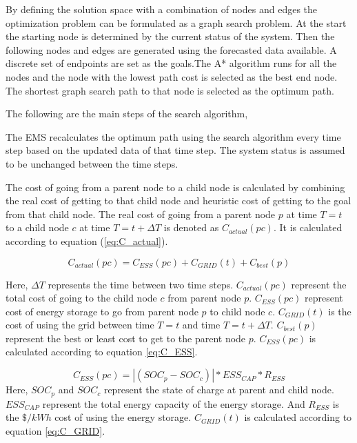 By defining the solution space with a combination of nodes and edges the optimization problem can be formulated as a graph search problem. At the start the starting node is determined by the current status of the system. Then the following nodes and edges are generated using the forecasted data available. A discrete set of endpoints are set as the goals.The A*  algorithm runs for all the nodes and the node with the lowest path cost is selected as the best end node. The shortest graph search path to that node is selected as the optimum path.

The following are the main steps of the search algorithm,


The EMS recalculates the optimum path using the search algorithm every time step based on the updated data of that time step. The system status is assumed to be unchanged between the time steps.

The cost of going from a parent node to a child node is calculated by combining the real cost of getting to that child node and heuristic cost of getting to the goal from that child node. The real cost of going from a parent node $p$ at time $T=t$ to a child node $c$ at time $T=t+\Delta T$ is denoted as $C_{actual}(pc)$. It is calculated according to equation (\ref{eq:C_actual}).

\begin{equation}
\label{eq:C_actual}
    C_{actual}(pc) =  C_{ESS}(pc)+C_{GRID}(t)+C_{best}(p)
\end{equation}

Here, $\Delta T$ represents the time between two time steps. $C_{actual}(pc)$ represent the total cost of going to the child node $c$ from parent node $p$. $C_{ESS}(pc)$ represent cost of energy storage to go from parent node $p$ to child node $c$. $C_{GRID}(t)$ is the cost of using the grid between time $T=t$ and time $T=t+\Delta T$. $C_{best}(p)$ represent the best or least cost to get to the parent node $p$. $C_{ESS}(pc)$ is calculated according to equation \ref{eq:C_ESS}.

\begin{equation}
\label{eq:C_ESS}
C_{ESS}(pc) = |(SOC_p - SOC_c)|*ESS_{CAP}*R_{ESS} 
\end{equation}
Here, $SOC_p$ and $SOC_c$ represent the state of charge at parent and child node. $ESS_{CAP}$ represent the total energy capacity of the energy storage. And $R_{ESS}$ is the $\$/kWh$ cost of using the energy storage. $C_{GRID}(t)$ is calculated according to equation \ref{eq:C_GRID}.

